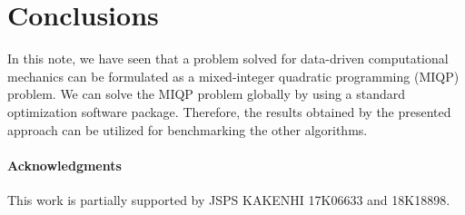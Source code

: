 \documentclass[a4paper,11pt]{scrartcl}
\theoremstyle{plain}
\theoremstyle{definition}
\theoremstyle{remark}
\begin{document}
\section{Conclusions}
\label{sec:conclude}

In this note, we have seen that a problem solved for 
data-driven computational mechanics \cite{KO16} can be formulated as 
a mixed-integer quadratic programming (MIQP) problem. 
We can solve the MIQP problem globally by using a standard 
optimization software package. 
Therefore, the results obtained by the presented approach can be 
utilized for benchmarking the other algorithms. 

\paragraph{Acknowledgments}

This work is partially supported by 
JSPS KAKENHI 17K06633 and 18K18898.
\end{document}
